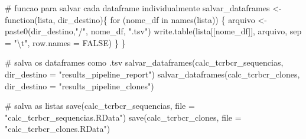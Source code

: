 \documentclass[
  letterpaper,
  DIV=11,
  numbers=noendperiod]{scrartcl}
\newenvironment{Shaded}{\begin{snugshade}}{\end{snugshade}}
\newcommand{\AttributeTok}[1]{\textcolor[rgb]{0.40,0.45,0.13}{#1}}
\newcommand{\CommentTok}[1]{\textcolor[rgb]{0.37,0.37,0.37}{#1}}
\newcommand{\ConstantTok}[1]{\textcolor[rgb]{0.56,0.35,0.01}{#1}}
\newcommand{\ControlFlowTok}[1]{\textcolor[rgb]{0.00,0.23,0.31}{#1}}
\newcommand{\FunctionTok}[1]{\textcolor[rgb]{0.28,0.35,0.67}{#1}}
\newcommand{\NormalTok}[1]{\textcolor[rgb]{0.00,0.23,0.31}{#1}}
\newcommand{\OtherTok}[1]{\textcolor[rgb]{0.00,0.23,0.31}{#1}}
\newcommand{\SpecialCharTok}[1]{\textcolor[rgb]{0.37,0.37,0.37}{#1}}
\newcommand{\StringTok}[1]{\textcolor[rgb]{0.13,0.47,0.30}{#1}}
\begin{document}
\begin{Shaded}
\begin{Highlighting}[]
\CommentTok{\# funcao para salvar cada dataframe individualmente}
\NormalTok{salvar\_dataframes }\OtherTok{\textless{}{-}} \ControlFlowTok{function}\NormalTok{(lista, dir\_destino)\{}
  \ControlFlowTok{for}\NormalTok{ (nome\_df }\ControlFlowTok{in} \FunctionTok{names}\NormalTok{(lista)) \{}
\NormalTok{    arquivo }\OtherTok{\textless{}{-}} \FunctionTok{paste0}\NormalTok{(dir\_destino,}\StringTok{"/"}\NormalTok{, nome\_df, }\StringTok{".tsv"}\NormalTok{)}
    \FunctionTok{write.table}\NormalTok{(lista[[nome\_df]], arquivo, }\AttributeTok{sep =} \StringTok{"}\SpecialCharTok{\textbackslash{}t}\StringTok{"}\NormalTok{, }\AttributeTok{row.names =} \ConstantTok{FALSE}\NormalTok{)}
\NormalTok{  \}}
\NormalTok{\}}

\CommentTok{\# salva os dataframes como .tsv}
\FunctionTok{salvar\_dataframes}\NormalTok{(calc\_tcrbcr\_sequencias, }\AttributeTok{dir\_destino =} \StringTok{"results\_pipeline\_report"}\NormalTok{)}
\FunctionTok{salvar\_dataframes}\NormalTok{(calc\_tcrbcr\_clones, }\AttributeTok{dir\_destino =} \StringTok{"results\_pipeline\_clones"}\NormalTok{)}

\CommentTok{\# salva as listas  }
\FunctionTok{save}\NormalTok{(calc\_tcrbcr\_sequencias, }\AttributeTok{file =} \StringTok{"calc\_tcrbcr\_sequencias.RData"}\NormalTok{)}
\FunctionTok{save}\NormalTok{(calc\_tcrbcr\_clones, }\AttributeTok{file =} \StringTok{"calc\_tcrbcr\_clones.RData"}\NormalTok{)}
\end{Highlighting}
\end{Shaded}
\end{document}
